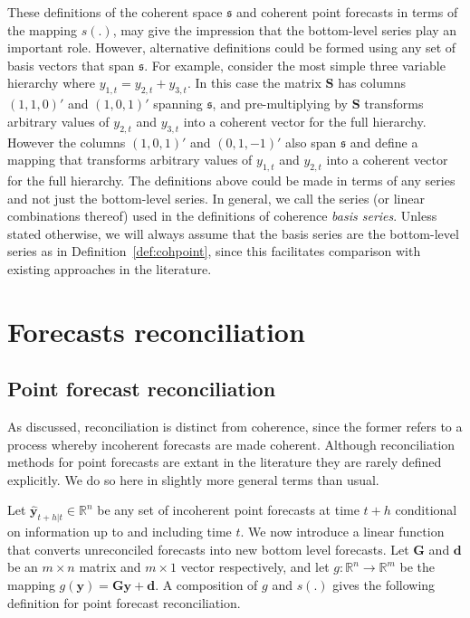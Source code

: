 \documentclass[12pt]{article}
\theoremstyle{definition}
\begin{document}
	These definitions of the coherent space $\mathfrak{s}$ and coherent point forecasts in terms of the mapping $s(.)$, may give the impression that the bottom-level series play an important role. However, alternative definitions could be formed using any set of basis vectors that span $\mathfrak{s}$. For example, consider the most simple three variable hierarchy where $y_{1,t}=y_{2,t}+y_{3,t}$. In this case the matrix $\bm{S}$ has columns $(1,1,0)'$ and $(1,0,1)'$ spanning $\mathfrak{s}$, and pre-multiplying by $\bm{S}$ transforms arbitrary values of $y_{2,t}$ and $y_{3,t}$ into a coherent vector for the full hierarchy. However the columns $(1,0,1)'$ and $(0,1,-1)'$ also span $\mathfrak{s}$ and define a mapping that transforms arbitrary values of $y_{1,t}$ and $y_{2,t}$ into a coherent vector for the full hierarchy. The definitions above could be made in terms of any series and not just the bottom-level series. In general, we call the series (or linear combinations thereof) used in the definitions of coherence \textit{basis series}. Unless stated otherwise, we will always assume that the basis series are the bottom-level series as in Definition~\ref{def:cohpoint}, since this facilitates comparison with existing approaches in the literature.
	
	
\section{Forecasts reconciliation}\label{sec:Reconciliation}
	
	\subsection{Point forecast reconciliation}\label{sec:reconciliation}
	
	As discussed, reconciliation is distinct from coherence, since the former refers to a process whereby incoherent forecasts are made coherent. Although reconciliation methods for point forecasts are extant in the literature they are rarely defined explicitly.  We do so here in slightly more general terms than usual. 
	
	Let $\hat{\bm{y}}_{t+h|t} \in \mathbb{R}^n$ be any set of incoherent point forecasts at time $t+h$ conditional on information up to and including time $t$. We now introduce a linear function that converts unreconciled forecasts into new bottom level forecasts.
	Let $\bm{G}$ and $\bm{d}$ be an $m\times n$ matrix and $m\times 1$ vector respectively, and let $g:\mathbb{R}^n \rightarrow \mathbb{R}^m$ be the mapping $g(\bm{y})=\bm{G}\bm{y}+\bm{d}$.  A composition of $g$ and $s(.)$ gives the following definition for point forecast reconciliation.
	
\end{document}
